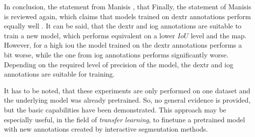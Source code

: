 In conclusion, the statement from Manisis \etal, that 
Finally, the statement of Manisis \etal is reviewed again, which claims that models trained on \gls{dextr} annotations perform equally well \cite{Man18-DEXTR}.
It can be said, that the \gls{dextr} and \gls{iog} annotations are suitable to train a new model, which performs equivalent on a lower $ IoU$ level and the \gls{map}.
However, for a high \gls{iou} the model trained on the \gls{dextr} annotations performs a bit worse, while the one from \gls{iog} annotations performs significantly worse.
Depending on the required level of precision of the model, the \gls{dextr} and \gls{iog} annotations are suitable for training.

It has to be noted, that these experiments are only performed on one dataset and the underlying model was already pretrained.
So, no general evidence is provided, but the basic capabilities have been demonstrated.
This approach may be especially useful, in the field of \textit{transfer learning}, to finetune a pretrained model with new annotations created by interactive segmentation methods.


